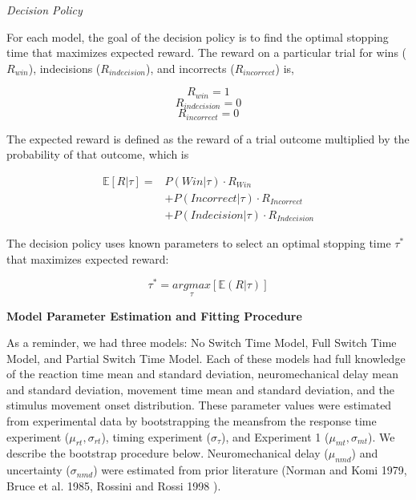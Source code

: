 \documentclass[12pt,letterpaper]{article}
\begin{document}
\noindent\emph{Decision Policy}

For each model, the goal of the decision policy is to find the optimal stopping time that maximizes expected reward. The reward on a particular trial for wins ($R_{win}$), indecisions ($R_{indecision}$), and incorrects ($R_{incorrect}$) is,

\begin{equation}
    R_{win} = 1
\end{equation}
\begin{equation}
    R_{indecision} = 0
\end{equation}
\begin{equation}
    R_{incorrect} = 0
\end{equation}

The expected reward is defined as the reward of a trial outcome multiplied by the probability of that outcome, which is

\begin{align}
    \mathbb{E}[R|\tau] = & P(Win|\tau) \cdot R_{Win} \nonumber \\ &+ P(Incorrect|\tau) \cdot R_{Incorrect} \nonumber \\ &+ P(Indecision|\tau) \cdot R_{Indecision}
\end{align}

The decision policy uses known parameters to select an optimal stopping time $\tau^*$ that maximizes expected reward:

\begin{equation}
    \tau^* = \underset{\tau}{argmax}[\mathbb{E}(R|\tau)]
\end{equation}

\noindent\textbf{Model Parameter Estimation and Fitting Procedure}

\noindent As a reminder, we had three models: No Switch Time Model, Full Switch Time Model, and Partial Switch Time Model. Each of these models had full knowledge of the reaction time mean and standard deviation, neuromechanical delay mean and standard deviation, movement time mean and standard deviation, and the stimulus movement onset distribution. These parameter values were estimated from experimental data by bootstrapping the meansfrom the response time experiment ($\mu_{rt}, \sigma_{rt}$), timing experiment ($\sigma_{\tau}$), and Experiment 1 ($\mu_{mt}, \sigma_{mt}$). We describe the bootstrap procedure below. Neuromechanical delay ($\mu_{nmd}$) and uncertainty ($\sigma_{nmd}$) were estimated from prior literature (Norman and Komi 1979, Bruce et al. 1985, Rossini and Rossi 1998 ).
\end{document}
